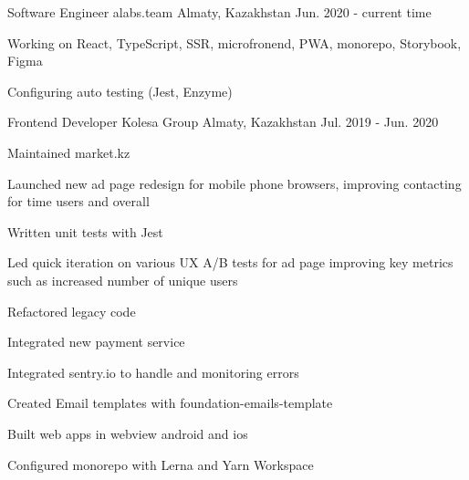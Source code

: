 

\begin{cventries}

  \cventry
    {Software Engineer} %
    {alabs.team} %
    {Almaty, Kazakhstan} %
    {Jun. 2020 - current time} %
    {
      \begin{cvitems} %
        \item {Working on React, TypeScript, SSR, microfronend, PWA, monorepo, Storybook, Figma}
        \item {Configuring auto testing (Jest, Enzyme)}
      \end{cvitems}
    }

  \cventry
    {Frontend Developer} %
    {Kolesa Group} %
    {Almaty, Kazakhstan} %
    {Jul. 2019 - Jun. 2020} %
    {
      \begin{cvitems} %
        \item {Maintained market.kz}
        \item {Launched new ad page redesign for mobile phone browsers, improving contacting for time users and overall}
        \item {Written unit tests with Jest}
        \item {Led quick iteration on various UX A/B tests for ad page improving key metrics such as increased number of unique users}
        \item {Refactored legacy code}
        \item {Integrated new payment service}
        \item {Integrated sentry.io to handle and monitoring errors}
        \item {Created Email templates with foundation-emails-template}
        \item {Built web apps in webview android and ios}
        \item {Configured monorepo with Lerna and Yarn Workspace}
      \end{cvitems}
    }


\end{cventries}
